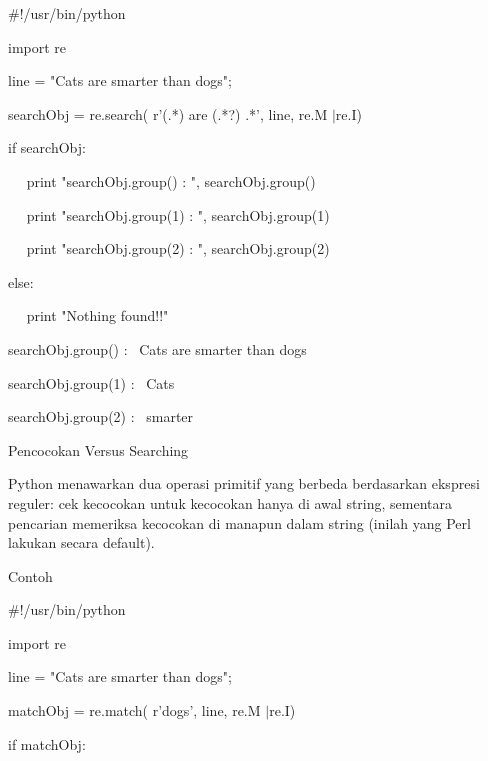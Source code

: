\documentclass[a4paper,12pt]{report}
\begin{document}
\vspace{12pt}
\noindent 
 $  \#  $!/usr/bin/python \par
\noindent 
import re \par
\vspace{12pt}
\noindent 
line = "Cats are smarter than dogs"; \par
\vspace{12pt}
\noindent 
searchObj = re.search( r'(.*) are (.*?) .*', line, re.M $  \vert  $re.I) \par
\vspace{12pt}
\noindent 
if searchObj: \par
\noindent 
~~ print "searchObj.group() : ", searchObj.group() \par
\noindent 
~~ print "searchObj.group(1) : ", searchObj.group(1) \par
\noindent 
~~ print "searchObj.group(2) : ", searchObj.group(2) \par
\noindent 
else: \par
\noindent 
~~ print "Nothing found!!" \par
\vspace{12pt}
\noindent 
searchObj.group() :~ Cats are smarter than dogs \par
\noindent 
searchObj.group(1) :~ Cats \par
\noindent 
searchObj.group(2) :~ smarter \par
\vspace{12pt}
\vspace{12pt}
\noindent 
Pencocokan Versus Searching \par
\vspace{12pt}
\noindent 
Python menawarkan dua operasi primitif yang berbeda berdasarkan ekspresi reguler: cek kecocokan untuk kecocokan hanya di awal string, sementara pencarian memeriksa kecocokan di manapun dalam string (inilah yang Perl lakukan secara default). \par
\noindent 
Contoh \par
\noindent 
 $  \#  $!/usr/bin/python \par
\noindent 
import re \par
\vspace{12pt}
\noindent 
line = "Cats are smarter than dogs"; \par
\vspace{12pt}
\noindent 
matchObj = re.match( r'dogs', line, re.M $  \vert  $re.I) \par
\noindent 
if matchObj: \par
\noindent 
\end{document}
